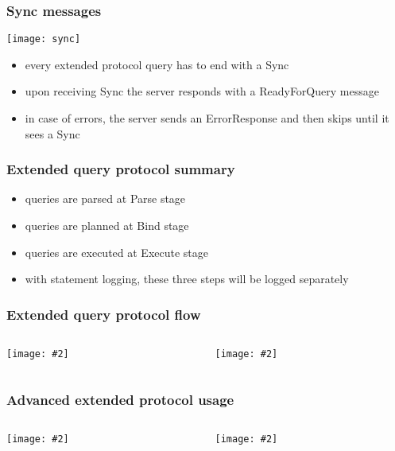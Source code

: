 \documentclass{beamer}
\newcommand{\mscdiagram}[2][1]{
  \begin{center}
    \texttt{[image: \#2]}
  \end{center}
}
\begin{document}
\begin{frame}
  \frametitle{Sync messages}

  \begin{center}
    \texttt{[image: sync]}
  \end{center}

  \begin{itemize}
  \item every extended protocol query has to end with a Sync
  \item upon receiving Sync the server responds with a ReadyForQuery message
  \item in case of errors, the server sends an ErrorResponse and then skips
    until it sees a Sync
  \end{itemize}
\end{frame}

\begin{frame}
  \frametitle{Extended query protocol summary}

  \begin{itemize}
  \item queries are parsed at Parse stage
  \item queries are planned at Bind stage
  \item queries are executed at Execute stage
  \item with statement logging, these three steps will be logged separately
  \end{itemize}
\end{frame}

\begin{frame}
  \frametitle{Extended query protocol flow}

  \begin{columns}[onlytextwidth]
    \begin{column}{0.5\textwidth}
      \mscdiagram[0.4]{extended-query-protocol-1}
    \end{column}
    \begin{column}{0.5\textwidth}
      \mscdiagram[0.4]{extended-query-protocol-2}
    \end{column}
  \end{columns}
\end{frame}

\begin{frame}
  \frametitle{Advanced extended protocol usage}

  \begin{columns}[onlytextwidth]
    \begin{column}{0.5\textwidth}
      \mscdiagram[0.4]{extended-query-protocol-adv-1}
    \end{column}
    \begin{column}{0.5\textwidth}
      \mscdiagram[0.4]{extended-query-protocol-adv-2}
    \end{column}
  \end{columns}
\end{frame}
\end{document}
